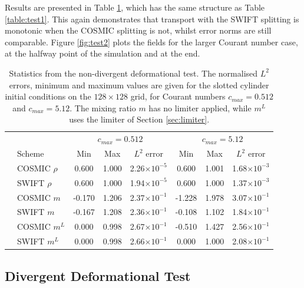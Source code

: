 \documentclass[11pt,a4paper]{article}
\begin{document}
Results are presented in Table \ref{table:test2}, which has the same structure as Table \ref{table:test1}.
This again demonstrates that transport with the SWIFT splitting is monotonic when the COSMIC splitting is not, whilst error norms are still comparable.
Figure \ref{fig:test2} plots the fields for the larger Courant number case, at the halfway point of the simulation and at the end. \\
\begin{table}[h!]
\small
\begin{center}
\begin{tabular}{| c | l | c c c | c c c |} \hline
  &  & \multicolumn{3}{c|}{$c_{max}=0.512$} & \multicolumn{3}{c|}{$c_{max}=5.12$} \\
  & Scheme &  Min & Max & $L^2$ error & Min & Max & $L^2$ error   \\ \hline
  \parbox[t]{2mm}{}
  & COSMIC $\rho$ & 0.600 & 1.000 & 2.26$\times 10^{-5}$ & 0.600 & 1.001 & 1.68$\times 10^{-3}$ \\
  & SWIFT $\rho$ & 0.600 & 1.000 & 1.94$\times 10^{-5}$ & 0.600 & 1.000 & 1.37$\times 10^{-3}$ \\
  & COSMIC $m$ & -0.170 & 1.206 & 2.37$\times 10^{-1}$ & -1.228 & 1.978 & 3.07$\times 10^{-1}$ \\
  & SWIFT $m$ & -0.167 & 1.208 & 2.36$\times 10^{-1}$ & -0.108 & 1.102 & 1.84$\times 10^{-1}$ \\
  & COSMIC $m^L$ & 0.000 & 0.998 & 2.67$\times 10^{-1}$ & -0.510 & 1.427 & 2.56$\times 10^{-1}$ \\
  & SWIFT $m^L$ & 0.000 & 0.998 & 2.66$\times 10^{-1}$ & 0.000 & 1.000 & 2.08$\times 10^{-1}$ \\ \hline
\end{tabular}
\caption{Statistics from the non-divergent deformational test. The normalised $L^2$ errors, minimum and maximum values are given for the slotted cylinder initial conditions on the $128\times128$ grid, for Courant numbers $c_{max}=0.512$ and $c_{max}=5.12$.
The mixing ratio $m$ has no limiter applied, while $m^L$ uses the limiter of Section \ref{sec:limiter}.}
\label{table:test2}
\end{center}
\end{table}

\subsection{Divergent Deformational Test} \label{sec:test3}
\end{document}
